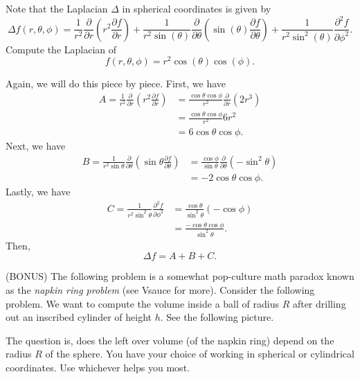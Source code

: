 \documentclass[12pt]{article} %
\begin{document}
\newpage
\begin{problem}
    Note that the Laplacian $\Delta$ in spherical coordinates is given by
    \[
        \Delta f(r,\theta,\phi) = \frac{1}{r^2} \frac{\partial}{\partial r} \left(r^2 \frac{\partial f}{\partial r}\right)+\frac{1}{r^2 \sin(\theta)}\frac{\partial}{\partial \theta} \left(\sin(\theta) \frac{\partial f}{\partial \theta}\right) + \frac{1}{r^2 \sin^2 (\theta)} \frac{\partial^2 f}{\partial \phi^2}.
    \]
    Compute the Laplacian of
    \[
       f(r,\theta,\phi) = r^2 \cos(\theta)\cos(\phi).
    \]
\end{problem}
\begin{solution}
 Again, we will do this piece by piece. First, we have
 \begin{align*}
    A=\frac{1}{r^2}\frac{\partial}{\partial r} \left(r^2 \frac{\partial f}{\partial r}\right)&= \frac{\cos \theta \cos \phi}{r^2}\frac{\partial}{\partial r} \left(2r^3\right) \\
    &= \frac{\cos \theta \cos\phi}{r^2} 6r^2\\
    &= 6 \cos \theta \cos \phi.
 \end{align*}
 Next, we have
 \begin{align*}
    B=\frac{1}{r^2 \sin \theta} \frac{\partial}{\partial \theta} \left(\sin \theta \frac{\partial f}{\partial \theta}\right) &= \frac{\cos \phi}{\sin \theta} \frac{\partial}{\partial \theta} \left( -\sin^2 \theta\right)\\
    &=-2\cos \theta \cos \phi.
 \end{align*}
 Lastly, we have
 \begin{align*}
    C=\frac{1}{r^2\sin^2 \theta} \frac{\partial^2 f}{\partial \phi^2}&= \frac{\cos \theta}{\sin^2 \theta} \left(-\cos \phi\right)\\
    &= \frac{-\cos \theta \cos \phi}{\sin^2 \theta}.
 \end{align*}
 Then,
 \[
 \Delta f = A+B+C.
 \]
\end{solution}

\newpage
\begin{problem} (BONUS)
The following problem is a somewhat pop-culture math paradox known as the \emph{napkin ring problem} (see Vsauce for more).  Consider the following problem.  We want to compute the volume inside a ball of radius $R$ after drilling out an inscribed cylinder of height $h$. See the following picture.
\begin{figure}[H]
	\centering
	\def\svgwidth{0.60\columnwidth}
	
\end{figure}
The question is, does the left over volume (of the napkin ring) depend on the radius $R$ of the sphere. You have your choice of working in spherical or cylindrical coordinates. Use whichever helps you most.
\end{problem}
\begin{solution}

\end{solution}
\end{document}
